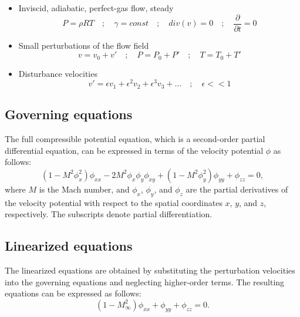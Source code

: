 \begin{itemize}
\item Inviscid, adiabatic, perfect-gas flow, steady
	\begin{equation*}
		P = \rho R T \quad ; \quad \gamma = const \quad ; \quad div(v) = 0 \quad ; \quad \frac{\partial }{\partial t} = 0
	\end{equation*}

\item Small perturbations of the flow field
	\begin{equation*}
		v = v_0 + v' \quad ; \quad P = P_0 + P' \quad ; \quad T = T_0 + T'
	\end{equation*}

\item Disturbance velocities
	\begin{equation*}
		v' = \epsilon v_1 + \epsilon^2 v_2 + \epsilon^3 v_3 + ... \quad ; \quad \epsilon << 1
	\end{equation*}

\end{itemize}


\subsection{Governing equations}
\label{subsec:governing_equations}
The full compressible potential equation, which is a second-order partial differential equation, can be expressed in terms of the velocity potential $\phi$ as follows:
\begin{equation}
	(1 - M^2\phi_x^2)\phi_{xx} - 2M^2\phi_x\phi_y\phi_{xy} + (1 - M^2\phi_y^2)\phi_{yy} + \phi_{zz} = 0,
\end{equation}
\label{eq:governing_equations}
where $M$ is the Mach number, and $\phi_x$, $\phi_y$, and $\phi_z$ are the partial derivatives of the velocity potential with respect to the spatial coordinates $x$, $y$, and $z$, respectively. The subscripts denote partial differentiation.

\subsection{Linearized equations}
\label{subsec:linearized_equations}
The linearized equations are obtained by substituting the perturbation velocities into the governing equations and neglecting higher-order terms. The resulting equations can be expressed as follows:
\begin{equation}
	(1 - M_\infty^2) \phi_{xx} + \phi_{yy} + \phi_{zz} = 0.
	\label{eq:small-disturb}
\end{equation}
	
